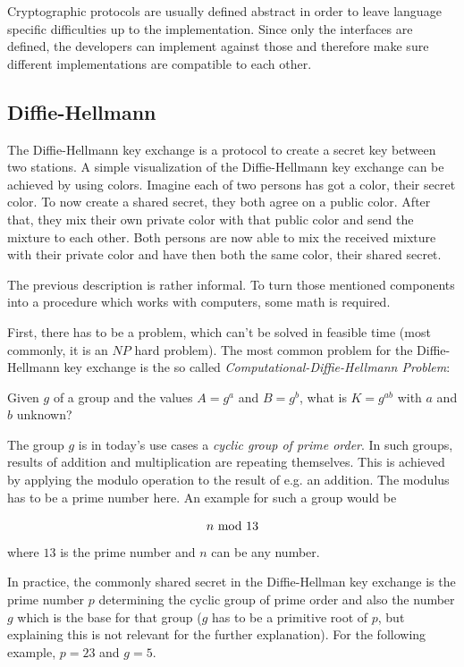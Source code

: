 Cryptographic protocols are usually defined abstract in order to leave language
specific difficulties up to the implementation. Since only the interfaces are
defined, the developers can implement against those and therefore make sure
different implementations are compatible to each other.

\subsection{Diffie-Hellmann}

The Diffie-Hellmann key exchange is a protocol to create a secret key between
two stations. A simple visualization of the Diffie-Hellmann key exchange can
be achieved by using colors. Imagine each of two persons has got a color,
their secret color. To now create a shared secret, they both agree on a
public color. After that, they mix their own private color with that public
color and send the mixture to each other. Both persons are now able to mix
the received mixture with their private color and have then both the same
color, their shared secret.

The previous description is rather informal. To turn those mentioned components
into a procedure which works with computers, some math is required.

First, there has to be a problem, which can't be solved in feasible time
(most commonly, it is an $NP$ hard problem). The most common problem for
the Diffie-Hellmann key exchange is the so called
\textit{Computational-Diffie-Hellmann Problem}:

\vspace{1em}

Given $g$ of a group and the values $A = g^a$ and $B = g^b$, what is
$K = g^{ab}$ with $a$ and $b$ unknown?

\vspace{1em}

The group $g$ is in today's use cases a \textit{cyclic group of prime order}.
In such groups, results of addition and multiplication are repeating
themselves. This is achieved by applying the modulo operation to the result
of e.g. an addition. The modulus has to be a prime number here. An example
for such a group would be

$$n \ \text{mod}\ 13$$ where $13$ is the prime number and $n$ can be any number.

In practice, the commonly shared secret in the Diffie-Hellman key exchange
is the prime number $p$ determining the cyclic group of prime order and also
the number $g$ which is the base for that group ($g$ has to be a primitive
root of $p$, but explaining this is not relevant for the further explanation).
For the following example, $p = 23$ and $g = 5$.


